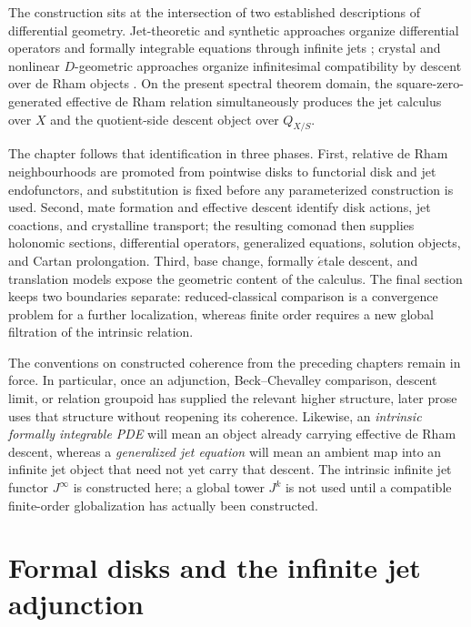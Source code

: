 The construction sits at the intersection of two established descriptions of
differential geometry. Jet-theoretic and synthetic approaches organize
differential operators and formally integrable equations through infinite jets
\cite{Marvan1986,KhavkineSchreiber2017,
AlfonsiYoung2023}; crystal and nonlinear
\(D\)-geometric approaches organize infinitesimal compatibility by descent
over de Rham objects
\cite{GaitsgoryRozenblyumCrystals,BeilinsonDrinfeld2004}. On the present spectral theorem domain, the square-zero-generated effective de
Rham relation simultaneously produces the jet calculus over \(X\) and the
quotient-side descent object over \(Q_{X/S}\).

The chapter follows that identification in three phases. First, relative de
Rham neighbourhoods are promoted from pointwise disks to functorial disk and
jet endofunctors, and substitution is fixed before any parameterized
construction is used. Second, mate formation and effective descent identify
disk actions, jet coactions, and crystalline transport; the resulting comonad
then supplies holonomic sections, differential operators, generalized
equations, solution objects, and Cartan prolongation. Third, base change,
formally \(\acute{e}\)tale descent, and translation models expose the geometric
content of the calculus. The final section keeps two boundaries separate:
reduced-classical comparison is a convergence problem for a further
localization, whereas finite order requires a new global filtration of the
intrinsic relation.

The conventions on constructed coherence from the preceding chapters remain in
force. In particular, once an adjunction, Beck--Chevalley comparison, descent
limit, or relation groupoid has supplied the relevant higher structure, later
prose uses that structure without reopening its coherence. Likewise, an
\emph{intrinsic formally integrable PDE} will mean an object already carrying
effective de Rham descent, whereas a \emph{generalized jet equation} will mean
an ambient map into an infinite jet object that need not yet carry that
descent. The intrinsic infinite jet functor \(J^\infty\) is constructed here;
a global tower \(J^k\) is not used until a compatible finite-order
globalization has actually been constructed.

\section{Formal disks and the infinite jet adjunction}
\label{sec:jets-formal-disk-adjunction}

